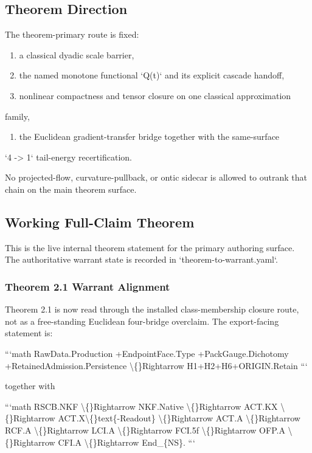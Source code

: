 \subsection{Theorem Direction}

The theorem-primary route is fixed:

\begin{enumerate}
\item a classical dyadic scale barrier,
\item the named monotone functional `Q(t)` and its explicit cascade handoff,
\item nonlinear compactness and tensor closure on one classical approximation
\end{enumerate}
   family,
\begin{enumerate}
\item the Euclidean gradient-transfer bridge together with the same-surface
\end{enumerate}
   `4 -> 1` tail-energy recertification.

No projected-flow, curvature-pullback, or ontic sidecar is allowed to outrank
that chain on the main theorem surface.

\subsection{Working Full-Claim Theorem}

This is the live internal theorem statement for the primary authoring surface.
The authoritative warrant state is recorded in `theorem-to-warrant.yaml`.

\subsubsection{Theorem 2.1 Warrant Alignment}

Theorem 2.1 is now read through the installed class-membership closure route,
not as a free-standing Euclidean four-bridge overclaim. The export-facing
statement is:

```math
RawData.Production
+EndpointFace.Type
+PackGauge.Dichotomy
+RetainedAdmission.Persistence
\textbackslash\{\}Rightarrow
H1+H2+H6+ORIGIN.Retain
```

together with

```math
RSCB.NKF
\textbackslash\{\}Rightarrow NKF.Native
\textbackslash\{\}Rightarrow ACT.KX
\textbackslash\{\}Rightarrow ACT.X\textbackslash\{\}text\{-Readout\}
\textbackslash\{\}Rightarrow ACT.A
\textbackslash\{\}Rightarrow RCF.A
\textbackslash\{\}Rightarrow LCI.A
\textbackslash\{\}Rightarrow FCI.5f
\textbackslash\{\}Rightarrow OFP.A
\textbackslash\{\}Rightarrow CFI.A
\textbackslash\{\}Rightarrow End\_\{NS\}.
```

